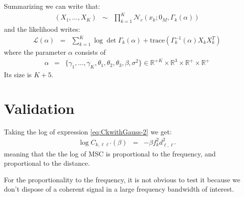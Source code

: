 \documentclass[a4paper, 12pt]{report}
\newcommand{\trace}[1]{\mathrm{trace}\left( #1 \right)}
\newtheorem{remark}{Remark}
\begin{document}
Summarizing   we can write that:
\begin{eqnarray*}
 (X_{1},\ldots,X_{K}) &\sim&\prod_{k=1}^{K}\mathcal{N}_{c}(x_{k};0_{M},\Gamma_{k}(\alpha))
\end{eqnarray*}
and the likelihood writes:
\begin{eqnarray}
 \mathcal{L}(\alpha)&=&
 \sum_{k=1}^{K}\log\det\Gamma_{k}(\alpha)+\trace{\Gamma_{k}^{-1}(\alpha)X_{k}X_{k}^{T}}
\end{eqnarray}
where the parameter $\alpha$ consists of
\begin{eqnarray}
\alpha&=&
\{
\gamma_{1},\ldots,\gamma_{K},\theta_{1},\theta_{2},\theta_{3},\beta,\sigma^{2}
\}
\in \mathds{R}^{+K}\times  \mathds{R}^{3}\times \mathds{R}^{+}\times \mathds{R}^{+}
\end{eqnarray}
Its size is $K+5$.

 \section{Validation}
Taking the log of expression \eqref{eq:CkwithGauss-2} we get:
\begin{eqnarray}
 \label{eq:logCkwithcauchy}
 \log C_{k,\ell\ell'} (\beta)&=& -\beta f_k^2 d_{\ell,\ell'}^2
\end{eqnarray}
meaning that the the log of MSC is proportional to the frequency, and proportional to the distance. 

For the proportionality to the frequency, it is not obvious to test it because we don't dispose of a coherent signal in a large frequency bandwidth of interest. 


\end{document}
